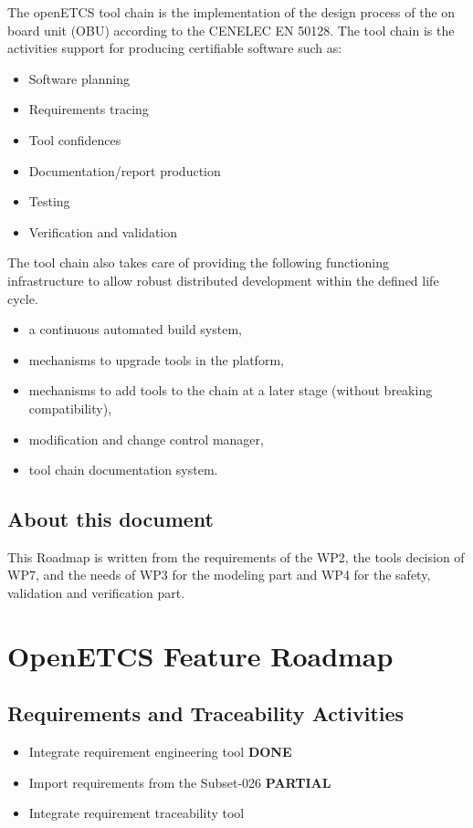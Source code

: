 \documentclass{openetcs_report}
\begin{document}
The openETCS tool chain is the implementation of the design process of the on board unit (OBU)
according to the CENELEC EN 50128. 
The tool chain is the activities support for producing certifiable
software such as:
\begin{itemize}
\item  Software planning
\item  Requirements tracing
\item  Tool confidences
\item  Documentation/report production
\item  Testing
\item Verification and validation
\end{itemize}
The tool chain also takes care of providing the following functioning infrastructure to allow
robust distributed development within the defined life cycle.
\begin{itemize}
\item  a continuous automated build system,
\item  mechanisms to upgrade tools in the platform,
\item  mechanisms to add tools to the chain at a later stage (without breaking compatibility),
\item  modification and change control manager,
\item  tool chain documentation system.
\end{itemize}

\section{About this document}
\label{sec-1-2}

This Roadmap is written from the requirements of the WP2, the tools
decision of WP7, and the needs of WP3 for the modeling part and WP4 for
the safety, validation and verification part.

\chapter{OpenETCS Feature Roadmap}
\label{chap-2}

\section{Requirements and Traceability Activities}
\begin{itemize}
\item Integrate requirement engineering tool {\bf DONE}
\item Import requirements from the Subset-026 {\bf PARTIAL}
\item Integrate requirement traceability tool
\end{itemize}
\end{document}
